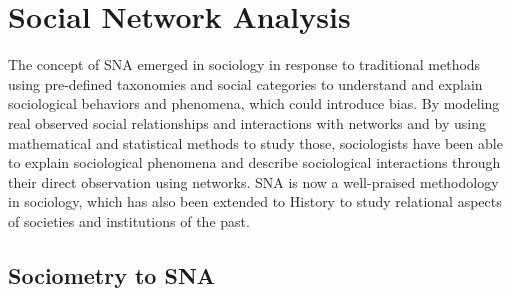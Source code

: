 

\section{Social Network Analysis}\label{sec:social-network-analysis}

The concept of SNA emerged in sociology in response to traditional methods using pre-defined taxonomies and social categories to understand and explain sociological behaviors and phenomena, which could introduce bias.
By modeling real observed social relationships and interactions with networks and by using mathematical and statistical methods to study those, sociologists have been able to explain sociological phenomena and describe sociological interactions through their direct observation using networks.
SNA is now a well-praised methodology in sociology, which has also been extended to History to study relational aspects of societies and institutions of the past.

\subsection{Sociometry to SNA}


